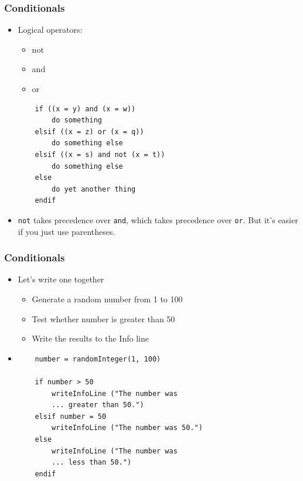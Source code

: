 \documentclass[handout]{beamer}
\begin{document}
\begin{frame}[fragile]
\frametitle{Conditionals}
\begin{itemize}
    \item <1-> Logical operators:
    \begin{itemize}
        \item not
        \item and
        \item or
    \end{itemize}
    
    \begin{verbatim}
    if ((x = y) and (x = w))
        do something
    elsif ((x = z) or (x = q))
        do something else
    elsif ((x = s) and not (x = t))
        do something else
    else
        do yet another thing
    endif
    \end{verbatim}

    \item <1-> \texttt{not} takes precedence over \texttt{and}, which takes precedence over \texttt{or}. But it's easier if you just use parentheses.

\end{itemize}
\end{frame}

\begin{frame}[fragile]
\frametitle{Conditionals}
\begin{itemize}
    \item <1-> Let's write one together
    \begin{itemize}
        \item Generate a random number from 1 to 100
        \item Test whether number is greater than 50
        \item Write the results to the Info line
    \end{itemize}
    
    \item<2->
    \begin{verbatim}
    number = randomInteger(1, 100)

    if number > 50
        writeInfoLine ("The number was 
        ... greater than 50.")
    elsif number = 50
        writeInfoLine ("The number was 50.")
    else
        writeInfoLine ("The number was
        ... less than 50.")
    endif
    \end{verbatim}

\end{itemize}
\end{frame}
\end{document}
